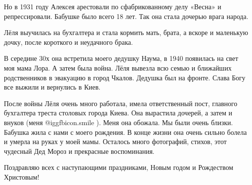 Но в 1931 году Алексея арестовали по сфабрикованному делу «Весна» и
репрессировали. Бабушке было всего 18 лет. Так она стала дочерью врага народа. 

Лёля выучилась на бухгалтера и стала кормить мать, брата, а вскоре и маленькую
дочку, после короткого и неудачного брака.

В середине 30х она встретила моего дедушку Наума, в 1940 появилась на свет моя
мама Лора. А затем была война. Лёля вывезла всю семью и ближайших родственников
в эвакуацию в город Чкалов. Дедушка был на фронте. Слава Богу все выжили и
вернулись в Киев.

После войны Лёля очень много работала, имела ответственный пост, главного
бухгалтера треста столовых города Киева. Она вырастила дочерей, а затем и
внуков (меня  @igg{fbicon.smile} ). Меня она обожала. Мы были очень близки. Бабушка жила с нами с
моего рождения. В конце жизни она очень сильно болела и умерла на руках у моей
мамы. Осталось много фотографий, стихов, этот чудесный Дед Мороз и прекрасные
воспоминания.

Поздравляю всех с наступающими праздниками, Новым годом и Рождеством Христовым!
